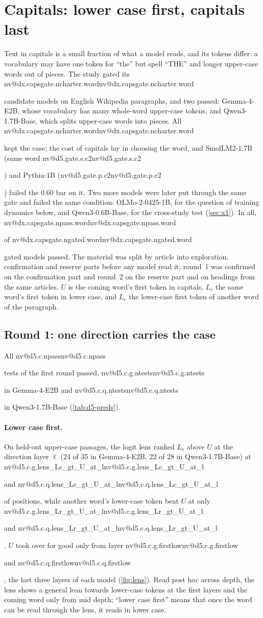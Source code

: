 \documentclass[11pt]{article}
\makeatletter
\newcommand{\nv}[1]{\ifcsname nv@#1\endcsname\csname nv@#1\endcsname\else\PackageError{numbers}{Unknown number key #1}{}\fi}
\newcommand{\qsix}{Qwen3-0.6B-Base}
\newcommand{\qbig}{Qwen3-1.7B-Base}
\newcommand{\olmo}{OLMo-2-0425-1B}
\newcommand{\gm}{Gemma-4-E2B}
\newcommand{\Uc}{\ensuremath{U}}
\newcommand{\Lc}{\ensuremath{L_c}}
\newcommand{\Lr}{\ensuremath{L_r}}
\newcommand{\DG}[1]{\nv{d5.c.g.#1}}
\newcommand{\DQ}[1]{\nv{d5.c.q.#1}}
\makeatother
\begin{document}
\section{Capitals: lower case first, capitals last}
\label{sec:caps}

Text in capitals is a small fraction of what a model reads, and its tokens differ: a vocabulary may have one token for ``the'' but spell ``THE'' and longer upper-case words out of pieces. The study gated its \nv{dx.capsgate.ncharter.word} candidate models on English Wikipedia paragraphs, and two passed: \gm{}, whose vocabulary has many whole-word upper-case tokens, and \qbig{}, which splits upper-case words into pieces. All \nv{dx.capsgate.ncharter.word} kept the case; the cost of capitals lay in choosing the word, and SmolLM2-1.7B (same word \nv{d5.gate.s.c2}) and Pythia-1B (\nv{d5.gate.p.c2}) failed the 0.60 bar on it. Two more models were later put through the same gate and failed the same condition: \olmo{}, for the question of training dynamics below, and \qsix{}, for the cross-study test (\cref{sec:x1}). In all, \nv{dx.capsgate.npass.word} of \nv{dx.capsgate.ngated.word} gated models passed. The material was split by article into exploration, confirmation and reserve parts before any model read it; round~1 was confirmed on the confirmation part and round~2 on the reserve part and on headings from the same articles. \Uc{} is the coming word's first token in capitals, \Lc{} the same word's first token in lower case, and \Lr{} the lower-case first token of another word of the paragraph.

\subsection{Round 1: one direction carries the case}

All \nv{d5.c.npass} tests of the first round passed, \nv{d5.c.g.ntests} in \gm{} and \nv{d5.c.q.ntests} in \qbig{} (\cref{tab:d5-preds}).

\paragraph{Lower case first.} On held-out upper-case passages, the logit lens ranked \Lc{} above \Uc{} at the direction layer $\ell$ (24 of 35 in \gm{}, 22 of 28 in \qbig{}) at \DG{lens_Lc_gt_U_at_l} and \DQ{lens_Lc_gt_U_at_l} of positions, while another word's lower-case token beat \Uc{} at only \DG{lens_Lr_gt_U_at_l} and \DQ{lens_Lr_gt_U_at_l}. \Uc{} took over for good only from layer \DG{firstlow} and \DQ{firstlow}, the last three layers of each model (\cref{fig:lens}). Read post hoc across depth, the lens shows a general lean towards lower-case tokens at the first layers and the coming word only from mid depth; ``lower case first'' means that once the word can be read through the lens, it reads in lower case.
\end{document}
